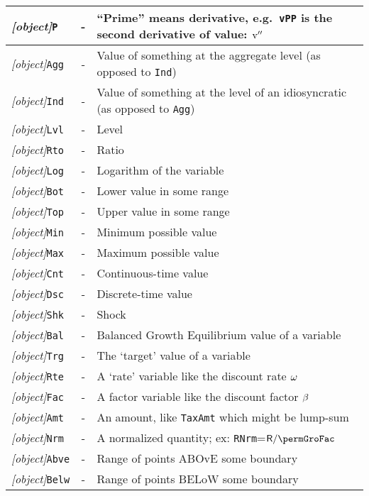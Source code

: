 \documentclass[12pt]{\econtex}
\begin{document}
\begin{table}[ht]
  \centering
  \begin{tabular}{|>{\ttfamily}lcl|}
    \hline
 \textit{[object]}\texttt{P} & - & ``Prime'' means derivative, e.g.\ \texttt{vPP} is the second derivative of value: $\mathrm{v}^{\prime\prime}$
\\    \hline
    \textit{[object]}\texttt{Agg} & - & Value of something at the aggregate level (as opposed to \texttt{Ind})
    \\ \textit{[object]}\texttt{Ind} & - & Value of something at the level of an idiosyncratic (as opposed to \texttt{Agg})
    \\ \textit{[object]}\texttt{Lvl} & - & Level 
    \\ \textit{[object]}\texttt{Rto} & - & Ratio 
    \\ \textit{[object]}\texttt{Log} & - & Logarithm of the variable
    \\ \textit{[object]}\texttt{Bot} & - & Lower value in some range 
    \\ \textit{[object]}\texttt{Top} & - & Upper value in some range 
    \\ \textit{[object]}\texttt{Min} & - & Minimum possible value 
    \\ \textit{[object]}\texttt{Max} & - & Maximum possible value 
    \\ \textit{[object]}\texttt{Cnt} & - & Continuous-time value
    \\ \textit{[object]}\texttt{Dsc} & - & Discrete-time value
    \\ \textit{[object]}\texttt{Shk} & - & Shock 
    \\ \textit{[object]}\texttt{Bal} & - & Balanced Growth Equilibrium value of a variable
    \\ \textit{[object]}\texttt{Trg} & - & The `target' value of a variable 
    \\ \textit{[object]}\texttt{Rte} & - & A `rate' variable like the discount rate $\omega$
    \\ \textit{[object]}\texttt{Fac} & - & A factor variable like the discount factor $\beta$
    \\ \textit{[object]}\texttt{Amt} & - & An amount, like \texttt{TaxAmt} which might be lump-sum
    \\ \textit{[object]}\texttt{Nrm} & - & A normalized quantity; ex: \texttt{RNrm}=$\Rfree/\permGroFac$
    \\ \textit{[object]}\texttt{Abve} & - & Range of points ABOvE some boundary
    \\ \textit{[object]}\texttt{Belw} & - & Range of points BELoW some boundary

\end{tabular}
\end{table}
\end{document}
